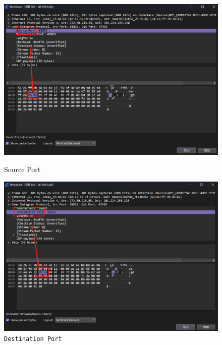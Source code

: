 \documentclass{article}
\begin{document}
	\begin{figure}[H]
		\centering
		\begin{minipage}[b]{0.45\textwidth}
			\includegraphics[width=\textwidth]{images/5.Source Port.png}
			\caption{Source Port}
		\end{minipage}
		\hfill
		\begin{minipage}[b]{0.45\textwidth}
			\includegraphics[width=\textwidth]{images/6.Destination Port.png}
			\caption{\texttt{Destination Port}}
		\end{minipage}
	\end{figure}
	
\end{document}
